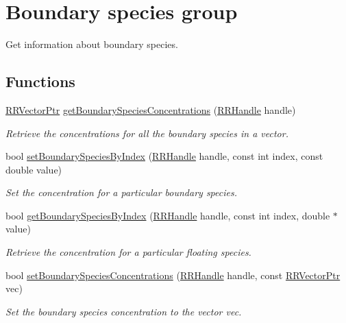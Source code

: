 \hypertarget{group__boundary}{\section{Boundary species group}
\label{group__boundary}
}


Get information about boundary species.  


\subsection*{Functions}
\begin{DoxyCompactItemize}
\item 
\hyperlink{rrc__types_8h_a3be72d6006034fd349f753d2bf441bf7}{R\-R\-Vector\-Ptr} \hyperlink{group__boundary_ga79f76cd262168c68697d915046781997}{get\-Boundary\-Species\-Concentrations} (\hyperlink{rrc__types_8h_a1d68f0592372208fa5a5f2799ea4b3ae}{R\-R\-Handle} handle)
\begin{DoxyCompactList}\small\item\em Retrieve the concentrations for all the boundary species in a vector. \end{DoxyCompactList}\item 
bool \hyperlink{group__boundary_ga456eb3f123433bba613db16c98cc7766}{set\-Boundary\-Species\-By\-Index} (\hyperlink{rrc__types_8h_a1d68f0592372208fa5a5f2799ea4b3ae}{R\-R\-Handle} handle, const int index, const double value)
\begin{DoxyCompactList}\small\item\em Set the concentration for a particular boundary species. \end{DoxyCompactList}\item 
bool \hyperlink{group__boundary_gacbc24df270121b930fe317f1f96bf478}{get\-Boundary\-Species\-By\-Index} (\hyperlink{rrc__types_8h_a1d68f0592372208fa5a5f2799ea4b3ae}{R\-R\-Handle} handle, const int index, double $\ast$value)
\begin{DoxyCompactList}\small\item\em Retrieve the concentration for a particular floating species. \end{DoxyCompactList}\item 
bool \hyperlink{group__boundary_ga2897a6feacbedd60bd05cf84dbabecfd}{set\-Boundary\-Species\-Concentrations} (\hyperlink{rrc__types_8h_a1d68f0592372208fa5a5f2799ea4b3ae}{R\-R\-Handle} handle, const \hyperlink{rrc__types_8h_a3be72d6006034fd349f753d2bf441bf7}{R\-R\-Vector\-Ptr} vec)
\begin{DoxyCompactList}\small\item\em Set the boundary species concentration to the vector vec. \end{DoxyCompactList}\item 

\end{DoxyCompactItemize}

